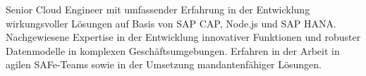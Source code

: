 \par{Senior Cloud Engineer mit umfassender Erfahrung in der Entwicklung wirkungsvoller L\"osungen auf Basis von SAP CAP, Node.js und SAP HANA.\\
Nachgewiesene Expertise in der Entwicklung innovativer Funktionen und robuster Datenmodelle in komplexen Gesch\"aftsumgebungen. Erfahren in der Arbeit in agilen SAFe-Teams sowie in der Umsetzung mandantenf\"ahiger L\"osungen.}
